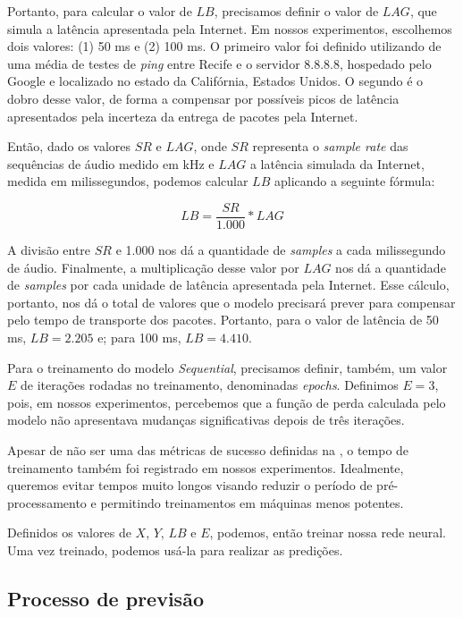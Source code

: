 Portanto, para calcular o valor de $LB$, precisamos definir o valor de $LAG$, que simula a latência apresentada pela Internet. Em nossos experimentos, escolhemos dois valores: (1) 50 ms e (2) 100 ms. O primeiro valor foi definido utilizando de uma média de testes de \textit{ping} entre Recife e o servidor 8.8.8.8, hospedado pelo Google e localizado no estado da Califórnia, Estados Unidos. O segundo é o dobro desse valor, de forma a compensar por possíveis picos de latência apresentados pela incerteza da entrega de pacotes pela Internet.

Então, dado os valores $SR$ e $LAG$, onde $SR$ representa o \textit{sample rate} das sequências de áudio medido em kHz e $LAG$ a latência simulada da Internet, medida em milissegundos, podemos calcular $LB$ aplicando a seguinte fórmula:

\begin{equation}
    LB = \frac{SR}{1.000} * LAG
\end{equation}

A divisão entre $SR$ e 1.000 nos dá a quantidade de \textit{samples} a cada milissegundo de áudio. Finalmente, a multiplicação desse valor por $LAG$ nos dá a quantidade de \textit{samples} por cada unidade de latência apresentada pela Internet. Esse cálculo, portanto, nos dá o total de valores que o modelo precisará prever para compensar pelo tempo de transporte dos pacotes. Portanto, para o valor de latência de 50 ms, $LB = 2.205$ e; para 100 ms, $LB = 4.410$.

Para o treinamento do modelo \textit{Sequential}, precisamos definir, também, um valor $E$ de iterações rodadas no treinamento, denominadas \textit{epochs}. Definimos $E = 3$, pois, em nossos experimentos, percebemos que a função de perda calculada pelo modelo não apresentava mudanças significativas depois de três iterações.

Apesar de não ser uma das métricas de sucesso definidas na , o tempo de treinamento também foi registrado em nossos experimentos. Idealmente, queremos evitar tempos muito longos visando reduzir o período de pré-processamento e permitindo treinamentos em máquinas menos potentes.

Definidos os valores de $X$, $Y$, $LB$ e $E$, podemos, então treinar nossa rede neural. Uma vez treinado, podemos usá-la para realizar as predições.

\subsection{Processo de previsão}

